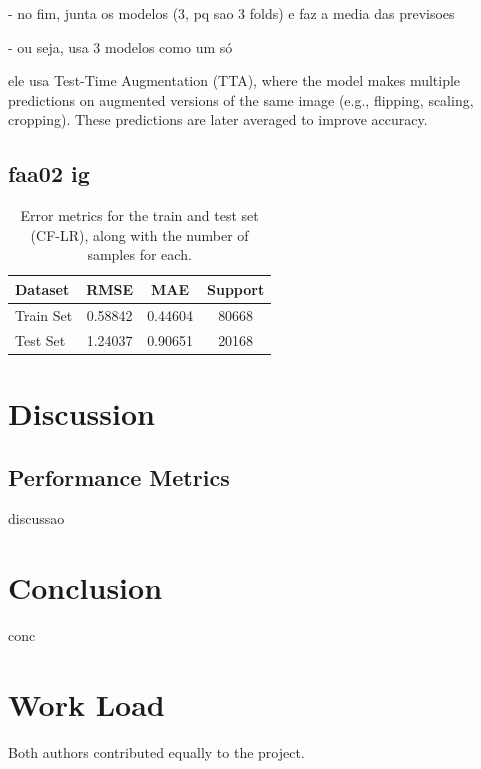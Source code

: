\documentclass[conference]{IEEEtran}
\begin{document}
- no fim, junta os modelos (3, pq sao 3 folds) e faz a media das previsoes

- ou seja, usa 3 modelos como um só

ele usa Test-Time Augmentation (TTA), where the model makes multiple predictions on augmented versions of the same image (e.g., flipping, scaling, cropping). These predictions are later averaged to improve accuracy.


\subsection{faa02 ig}



\begin{table}[H]
\centering
\caption{Error metrics for the train and test set (CF-LR), along with the number of samples for each.}
\label{tab:model01_results}
\begin{tabular}{lccc}
\toprule
\textbf{Dataset} & \textbf{RMSE} & \textbf{MAE} & \textbf{Support} \\
\midrule
Train Set & 0.58842 & 0.44604 & 80668 \\
Test Set & 1.24037 & 0.90651 & 20168 \\
\bottomrule
\end{tabular}
\end{table}

\section{Discussion} 

\subsection{Performance Metrics}

discussao


\section{Conclusion}

conc


\section*{Work Load}

Both authors contributed equally to the project.



\end{document}
